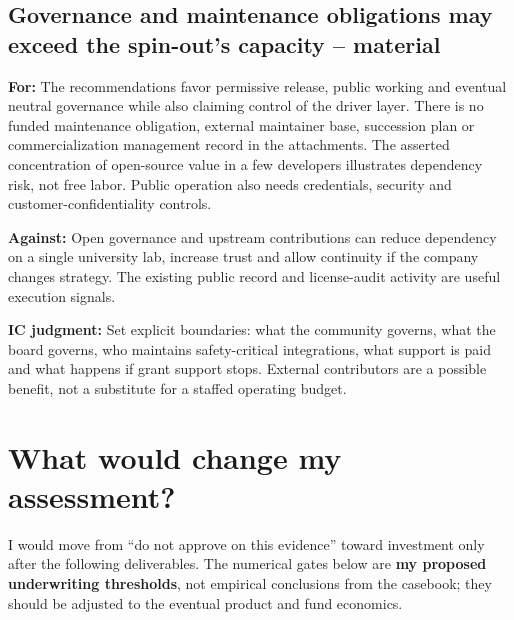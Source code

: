 \subsection{Governance and maintenance obligations may exceed the
spin-out's capacity --
material}\label{governance-and-maintenance-obligations-may-exceed-the-spin-outs-capacity-material}

\textbf{For:} The recommendations favor permissive release, public
working and eventual neutral governance while also claiming control of
the driver layer. There is no funded maintenance obligation, external
maintainer base, succession plan or commercialization management record
in the attachments. The asserted concentration of open-source value in a
few developers illustrates dependency risk, not free labor. Public
operation also needs credentials, security and customer-confidentiality
controls. \citep{InputRecommendations,Hoffmann2024Value}

\textbf{Against:} Open governance and upstream contributions can reduce
dependency on a single university lab, increase trust and allow
continuity if the company changes strategy. The existing public record
and license-audit activity are useful execution signals.

\textbf{IC judgment:} Set explicit boundaries: what the community
governs, what the board governs, who maintains safety-critical
integrations, what support is paid and what happens if grant support
stops. External contributors are a possible benefit, not a substitute
for a staffed operating budget.

\section{What would change my
assessment?}\label{what-would-change-my-assessment}

I would move from ``do not approve on this evidence'' toward investment
only after the following deliverables. The numerical gates below are
\textbf{my proposed underwriting thresholds}, not empirical conclusions
from the casebook; they should be adjusted to the eventual product and
fund economics.

